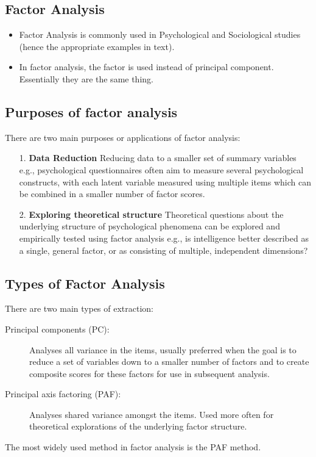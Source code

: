 \subsection{Factor Analysis}

\begin{itemize}
\item Factor Analysis is commonly used in Psychological and Sociological studies (hence the appropriate examples in text).
\item In factor analysis, the factor is used instead of principal component. Essentially they are the same thing.
\end{itemize}

\subsection{Purposes of factor analysis}

There are two main purposes or applications of factor analysis:

\begin{itemize}
\item[1.] \textbf{Data Reduction}
Reducing data to a smaller set of summary variables e.g., psychological questionnaires often aim to measure several psychological constructs, with each latent variable measured using multiple items which can be combined in a smaller number of factor scores.
\item[2.] \textbf{Exploring theoretical structure}
Theoretical questions about the underlying structure of psychological phenomena can be explored and empirically tested using factor analysis e.g., is intelligence better described as a single, general factor, or as consisting of multiple, independent dimensions?
\end{itemize}


\subsection{Types of Factor Analysis}
There are two main types of extraction:
\begin{description}
\item[Principal components (PC):] Analyses all variance in the items, usually preferred when the goal is to reduce a set of variables down to a smaller number of factors and to create composite scores for these factors for use in subsequent analysis.
\item[Principal axis factoring (PAF):] Analyses shared variance amongst the items. Used more often for theoretical explorations of the underlying factor structure.
\end{description}
The most widely used method in factor analysis is the PAF method.


